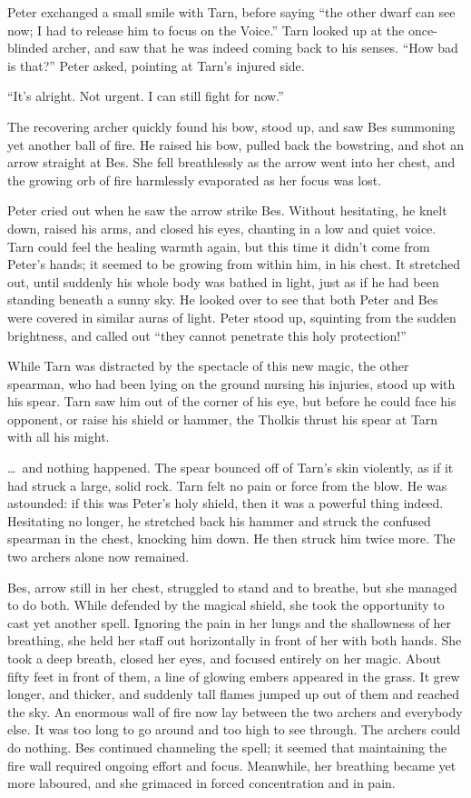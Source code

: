 Peter exchanged a small smile with Tarn, before saying ``the other dwarf can see now; I had to release him to focus on the Voice.''  Tarn looked up at the once-blinded archer, and saw that he was indeed coming back to his senses.  ``How bad is that?'' Peter asked, pointing at Tarn's injured side.

``It's alright.  Not urgent.  I can still fight for now.''

The recovering archer quickly found his bow, stood up, and saw Bes summoning yet another ball of fire.  He raised his bow, pulled back the bowstring, and shot an arrow straight at Bes.  She fell breathlessly as the arrow went into her chest, and the growing orb of fire harmlessly evaporated as her focus was lost.

Peter cried out when he saw the arrow strike Bes.  Without hesitating, he knelt down, raised his arms, and closed his eyes, chanting in a low and quiet voice.  Tarn could feel the healing warmth again, but this time it didn't come from Peter's hands; it seemed to be growing from within him, in his chest.  It stretched out, until suddenly his whole body was bathed in light, just as if he had been standing beneath a sunny sky.  He looked over to see that both Peter and Bes were covered in similar auras of light.  Peter stood up, squinting from the sudden brightness, and called out ``they cannot penetrate this holy protection!''

While Tarn was distracted by the spectacle of this new magic, the other spearman, who had been lying on the ground nursing his injuries, stood up with his spear.  Tarn saw him out of the corner of his eye, but before he could face his opponent, or raise his shield or hammer, the Tholkis thrust his spear at Tarn with all his might.

\ldots\ and nothing happened.  The spear bounced off of Tarn's skin violently, as if it had struck a large, solid rock.  Tarn felt no pain or force from the blow.  He was astounded: if this was Peter's holy shield, then it was a powerful thing indeed.  Hesitating no longer, he stretched back his hammer and struck the confused spearman in the chest, knocking him down.  He then struck him twice more.  The two archers alone now remained.

Bes, arrow still in her chest, struggled to stand and to breathe, but she managed to do both.  While defended by the magical shield, she took the opportunity to cast yet another spell.  Ignoring the pain in her lungs and the shallowness of her breathing, she held her staff out horizontally in front of her with both hands.  She took a deep breath, closed her eyes, and focused entirely on her magic.  About fifty feet in front of them, a line of glowing embers appeared in the grass.  It grew longer, and thicker, and suddenly tall flames jumped up out of them and reached the sky.  An enormous wall of fire now lay between the two archers and everybody else.  It was too long to go around and too high to see through.  The archers could do nothing.  Bes continued channeling the spell; it seemed that maintaining the fire wall required ongoing effort and focus.  Meanwhile, her breathing became yet more laboured, and she grimaced in forced concentration and in pain.

